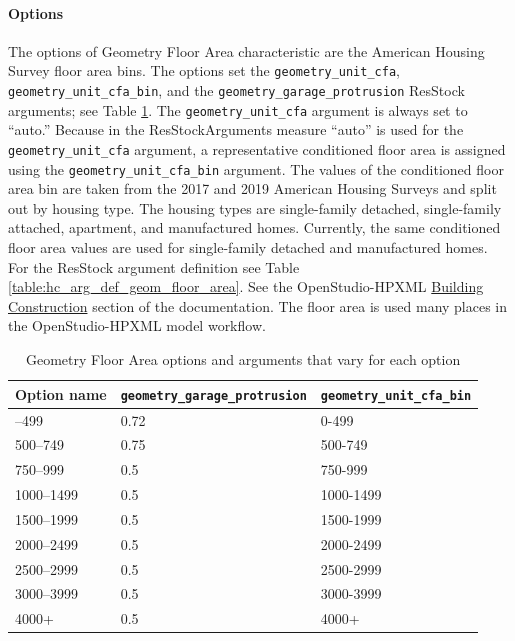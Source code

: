\paragraph{Options}
The options of Geometry Floor Area characteristic are the American Housing Survey floor area bins. The options set the \texttt{geometry\_unit\_cfa}, \texttt{geometry\_unit\_cfa\_bin}, and the \texttt{geometry\_garage\_protrusion} ResStock arguments; see Table \ref{table:hc_opt_geom_floor_area}. The \texttt{geometry\_unit\_cfa} argument is always set to ``auto.'' Because in the ResStockArguments measure ``auto'' is used for the \texttt{geometry\_unit\_cfa} argument, a representative conditioned floor area is assigned using the \texttt{geometry\_unit\_cfa\_bin} argument. The values of the conditioned floor area bin are taken from the 2017 and 2019 American Housing Surveys and split out by housing type. The housing types are single-family detached, single-family attached, apartment, and manufactured homes. Currently, the same conditioned floor area values are used for single-family detached and manufactured homes. For the ResStock argument definition see Table \ref{table:hc_arg_def_geom_floor_area}. See the OpenStudio-HPXML \href{https://openstudio-hpxml.readthedocs.io/en/v1.8.1/workflow_inputs.html#hpxml-building-construction}{Building Construction} section of the documentation. The floor area is used many places in the OpenStudio-HPXML model workflow.

\begin{longtable}[]{ |p{}|p{4cm}|p{4cm}| }
\caption{Geometry Floor Area options and arguments that vary for each option} \label{table:hc_opt_geom_floor_area} \\
\toprule\noalign{}
Option name & \texttt{geometry\_garage\_protrusion} &
\texttt{geometry\_unit\_cfa\_bin}\\
\midrule\noalign{}
\endhead
\bottomrule\noalign{}
\endlastfoot
0--499 & 0.72 & 0-499 \\
\hline
500--749 & 0.75 & 500-749 \\
\hline
750--999 & 0.5 & 750-999 \\
\hline
1000--1499 & 0.5 & 1000-1499 \\
\hline
1500--1999 & 0.5 & 1500-1999 \\
\hline
2000--2499 & 0.5 & 2000-2499 \\
\hline
2500--2999 & 0.5 & 2500-2999 \\
\hline
3000--3999 & 0.5 & 3000-3999 \\
\hline
4000+ & 0.5 & 4000+ \\
\end{longtable}

